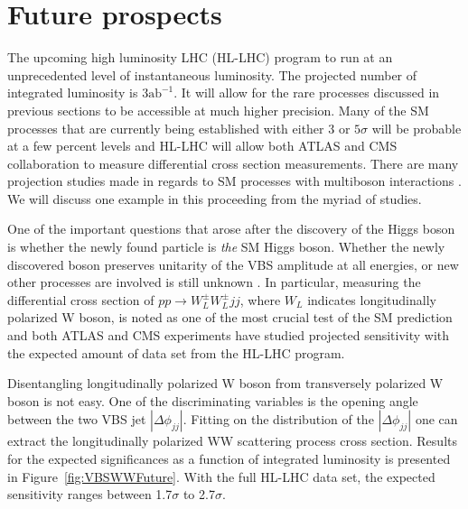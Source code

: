 \section{Future prospects}

The upcoming high luminosity LHC (HL-LHC) program to run at an unprecedented level of instantaneous luminosity.
The projected number of integrated luminosity is 3$\textrm{ab}^{-1}$.
It will allow for the rare processes discussed in previous sections to be accessible at much higher precision.
Many of the SM processes that are currently being established with either $3$ or $5\sigma$ will be probable at a few percent levels and HL-LHC will allow both ATLAS and CMS collaboration to measure differential cross section measurements.
There are many projection studies made in regards to SM processes with multiboson interactions \cite{Atlas:2019qfx}.
We will discuss one example in this proceeding from the myriad of studies.

One of the important questions that arose after the discovery of the Higgs boson is whether the newly found particle is \emph{the} SM Higgs boson.
Whether the newly discovered boson preserves unitarity of the VBS amplitude at all energies, or new other processes are involved is still unknown \cite{Veltman:1976rt,Lee:1977yc,Lee:1977eg}.
In particular, measuring the differential cross section of $pp\to W_{L}^{\pm}W_{L}^{\pm}jj$, where $W_{L}$ indicates longitudinally polarized W boson, is noted as one of the most crucial test of the SM prediction and both ATLAS and CMS experiments have studied projected sensitivity with the expected amount of data set from the HL-LHC program.

Disentangling longitudinally polarized W boson from transversely polarized W boson is not easy.
One of the discriminating variables is the opening angle between the two VBS jet $|\Delta\phi_{jj}|$.
Fitting on the distribution of the $|\Delta\phi_{jj}|$ one can extract the longitudinally polarized WW scattering process cross section.
Results for the expected significances as a function of integrated luminosity is presented in Figure~\ref{fig:VBSWWFuture}.
With the full HL-LHC data set, the expected sensitivity ranges between 1.7$\sigma$ to 2.7$\sigma$.

